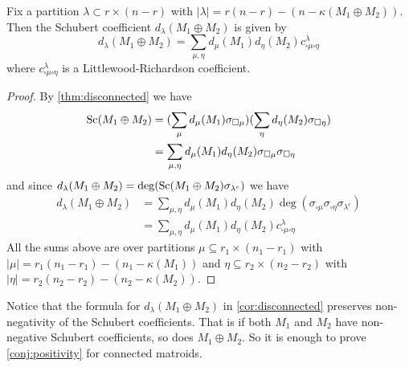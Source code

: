 \begin{corollary}
\label{cor:disconnected}
    Fix a partition $\lambda \subset r \times (n-r)$ with $|\lambda| = r(n-r) - (n - \kappa(M_1 \oplus M_2))$. Then the Schubert coefficient $d_\lambda(M_1 \oplus M_2)$ is given by
    \begin{equation*}
        d_\lambda(M_1 \oplus M_2) = \sum_{\mu, \eta} d_\mu(M_1) d_\eta(M_2) c_{\square\mu \square\eta}^\lambda
    \end{equation*}
    where $c_{\square\mu \square\eta}^\lambda$ is a Littlewood-Richardson coefficient.
\end{corollary}
\begin{proof}
    By \cref{thm:disconnected} we have
    \begin{align*}
        \operatorname{\mathrm{Sc}}(M_1 \oplus M_2) &= (\sum_\mu d_\mu(M_1) \sigma_{\square \mu}) (\sum_\eta d_\eta(M_2) \sigma_{\square \eta})\\
        &= \sum_{\mu, \eta} d_\mu(M_1) d_\eta(M_2) \sigma_{\square \mu} \sigma_{\square \eta}
    \end{align*}
    and since $d_\lambda(M_1\oplus M_2) = \deg(\operatorname{\mathrm{Sc}}(M_1 \oplus M_2) \sigma_{\lambda^c})$ we have
    \begin{align*}
        d_\lambda(M_1 \oplus M_2) &= \sum_{\mu, \eta} d_\mu(M_1) d_\eta(M_2) \deg(\sigma_{\square \mu} \sigma_{\square \eta} \sigma_{\lambda^c})\\
        &= \sum_{\mu, \eta} d_\mu(M_1) d_\eta(M_2) c_{\square\mu \square\eta}^\lambda
    \end{align*}
    All the sums above are over partitions $\mu \subseteq r_1 \times (n_1 - r_1)$ with $|\mu| = r_1(n_1-r_1) - (n_1 - \kappa(M_1))$ and $\eta \subseteq r_2 \times (n_2 - r_2)$ with $|\eta| = r_2(n_2-r_2) - (n_2 - \kappa(M_2))$.
\end{proof}

Notice that the formula for \(d_\lambda(M_1\oplus M_2)\) in \cref{cor:disconnected} preserves non-negativity of the Schubert coefficients. That is if both \(M_1\) and \(M_2\) have non-negative Schubert coefficients, so does \(M_1 \oplus M_2\). So it is enough to prove \cref{conj:positivity} for connected matroids.